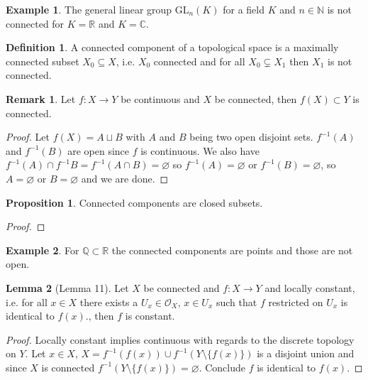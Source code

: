 \documentclass[a4paper]{book}
\theoremstyle{definition}
\newtheorem{definition}{Definition}[]
\newtheorem{example}{Example}[definition]
\newtheorem{lemma}[definition]{Lemma}
\newtheorem{proposition}{Proposition}[definition]
\newtheorem*{remark}{Remark}
\begin{document}
    \begin{example}
        The general linear group \(\mathrm{GL}_n(K)\) for a field \(K\) and \(n \in \mathbb{N}\) is not connected for \(K = \mathbb{R}\) and \(K = \mathbb{C}\).
    \end{example}

    \begin{defbox}
        \begin{definition}
            A connected component of a topological space is a maximally connected subset \(X_0 \subseteq X\), i.e. \(X_0\) connected and for all \(X_0 \subsetneq X_1\) then \(X_1\) is not connected.
        \end{definition}
    \end{defbox}

    \begin{remark}
        Let \(f: X \longrightarrow Y\) be continuous and \(X\) be connected, then \(f(X) \subset Y\) is connected.
    \end{remark}
    \begin{proof}
        Let \(f(X) = A \sqcup B\) with \(A\) and \(B\) being two open disjoint sets. \(f^{-1}(A)\) and \(f^{-1}(B)\) are open since \(f\) is continuous. We also have \(f^{-1}(A) \cap f^{-1}B = f^{-1}(A \cap B) = \varnothing\) so \(f^{-1}(A) = \varnothing\) or \(f^{-1}(B) = \varnothing\), so \(A = \varnothing\) or \(B = \varnothing\) and we are done.
    \end{proof}
    \begin{proposition}
        Connected components are closed subsets.
    \end{proposition}
    \begin{proof}
    \end{proof}
    \begin{example}
        For \(\mathbb{Q} \subset \mathbb{R}\) the connected components are points and those are not open.
    \end{example}
    \begin{lemma}[Lemma 11]
        Let \(X\) be connected and \(f: X \longrightarrow Y\) and locally constant, i.e. for all \(x \in X\) there exists a \(U_x \in \mathcal{O}_X\), \(x \in U_x\) such that \(f\) restricted on \(U_x\) is identical to \(f(x)\)., then \(f\) is constant.
    \end{lemma}
    \begin{proof}
        Locally constant implies continuous with regards to the discrete topology on \(Y\). Let \(x \in X\), \(X = f^{-1}(f(x)) \cup f^{-1}(Y \setminus \{f(x)\})\) is a disjoint union and since \(X\) is connected \(f^{-1}(Y \setminus \{f(x)\}) = \varnothing\). Conclude \(f\) is identical to \(f(x)\).
    \end{proof}
\end{document}
